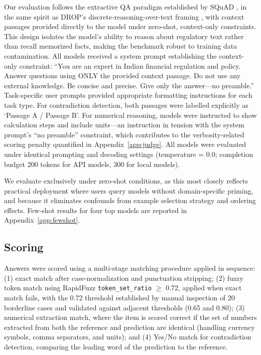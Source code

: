 \documentclass[11pt]{article}
\begin{document}
Our evaluation follows the extractive QA paradigm established by SQuAD \citep{rajpurkar2016squad}, in the same spirit as DROP's discrete-reasoning-over-text framing \citep{dua2019drop}, with context passages provided directly to the model under zero-shot, context-only constraints. This design isolates the model's ability to reason about regulatory text rather than recall memorized facts, making the benchmark robust to training data contamination. All models received a system prompt establishing the context-only constraint: ``You are an expert in Indian financial regulation and policy. Answer questions using ONLY the provided context passage. Do not use any external knowledge. Be concise and precise. Give only the answer---no preamble.'' Task-specific user prompts provided appropriate formatting instructions for each task type. For contradiction detection, both passages were labelled explicitly as `Passage A / Passage B'. For numerical reasoning, models were instructed to show calculation steps and include units---an instruction in tension with the system prompt's ``no preamble'' constraint, which contributes to the verbosity-related scoring penalty quantified in Appendix~\ref{app:judge}. All models were evaluated under identical prompting and decoding settings (temperature = 0.0; completion budget 200 tokens for API models, 300 for local models).

We evaluate exclusively under zero-shot conditions, as this most closely reflects practical deployment where users query models without domain-specific priming, and because it eliminates confounds from example selection strategy and ordering effects. Few-shot results for four top models are reported in Appendix~\ref{app:fewshot}.

\subsection{Scoring}
\label{sec:scoring}

Answers were scored using a multi-stage matching procedure applied in sequence: (1) exact match after case-normalization and punctuation stripping; (2) fuzzy token match using RapidFuzz \texttt{token\_set\_ratio} $\geq$ 0.72, applied when exact match fails, with the 0.72 threshold established by manual inspection of 20 borderline cases and validated against adjacent thresholds (0.65 and 0.80); (3) numerical extraction match, where the item is scored correct if the set of numbers extracted from both the reference and prediction are identical (handling currency symbols, comma separators, and units); and (4) Yes/No match for contradiction detection, comparing the leading word of the prediction to the reference.
\end{document}
